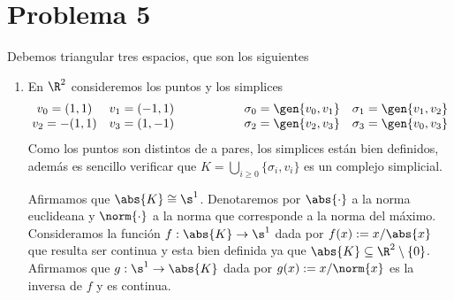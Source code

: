 \documentclass{article}
\begin{document}
\section*{Problema 5}
\noindent Debemos triangular tres espacios, que son los siguientes
\begin{enumerate}
    \item En $\R^{2}$ consideremos los puntos y los simplices
    \begin{equation*}
        \begin{matrix}
            v_{0}=(1,1) & v_{1}=(-1,1) \\
            v_{2}=-(1,1) & v_{3}=(1,-1)
        \end{matrix}
        \hspace{2cm}\begin{matrix}
            \sigma_{0}=\gen{v_{0},v_{1}} & \sigma_{1}=\gen{v_{1},v_{2}} \\
            \sigma_{2}=\gen{v_{2},v_{3}} & \sigma_{3}=\gen{v_{0},v_{3}}
        \end{matrix}
    \end{equation*}
    Como los puntos son distintos de a pares, los simplices están bien definidos, además es 
    sencillo verificar que $K=\bigcup_{i\geq0}\{\sigma_{i},v_{i}\}$ es un complejo simplicial.
    \begin{center}
    \end{center}
    Afirmamos que $\abs{K}\cong\s^{1}$. Denotaremos por $\abs{\cdot}$ a la norma euclideana y 
    $\norm{\cdot}$ a la norma que corresponde a la norma del máximo. Consideramos la función 
    $f:\abs{K}\to\s^{1}$ dada por $f(x):=x/\abs{x}$ que resulta ser continua y esta bien definida 
    ya que $\abs{K}\subseteq\R^{2}\setminus\{0\}$. Afirmamos que $g:\s^{1}\to\abs{K}$ dada por 
    $g(x):=x/\norm{x}$ es la inversa de $f$ y es continua.


\end{enumerate}
\end{document}
